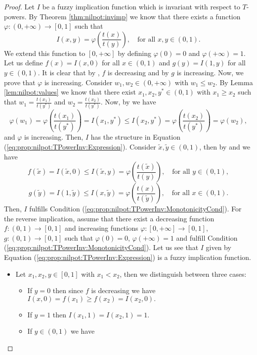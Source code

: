\begin{proof}
	Let $I$ be a fuzzy implication function which is invariant with respect to $T$-powers. By Theorem \ref{thm:nilpot:invimp} 
	we know that there exists a function $\varphi:(0,+\infty) \to [0,1]$ such that
	$$I(x,y)=\varphi \left(\frac{t(x)}{t(y)}\right), \quad \text{for all }x,y \in (0,1).$$
	We extend this function to $[0,+\infty]$ by defining $\varphi(0)=0$ and $\varphi(+\infty)=1$. Let us define $f(x)=I(x,0)$ for all $x \in (0,1)$ and $g(y)=I(1,y)$ for all $y \in (0,1)$. It is clear that by \Ione, $f$ is decreasing and by \Itwo $g$ is increasing. Now, we prove that $\varphi$ is increasing. Consider $w_1,w_2 \in (0,+\infty)$ with $w_1 \leq w_2$. By Lemma \ref{lem:nilpot:values} we know that there exist $x_1,x_2,y^* \in (0,1)$ with $x_1 \geq x_2$ such that $w_1=\frac{t(x_1)}{t(y^*)}$ and $w_2=\frac{t(x_2)}{t(y^*)}$. Now, by \Ione we have
	$$\varphi(w_1) = \varphi \left(\frac{t(x_1)}{t(y^*)}\right) = I(x_1,y^*) \leq I(x_2,y^*) = \varphi \left(\frac{t(x_2)}{t(y^*)}\right) = \varphi(w_2),$$
	and $\varphi$ is increasing. Then, $I$ has the structure in Equation (\ref{eq:prop:nilpot:TPowerInv:Expression}). Consider $\tilde{x},\tilde{y} \in (0,1)$, then by \Ione and \Itwo we have
	$$f(\tilde{x}) = I(\tilde{x},0) \leq I(\tilde{x},y) = \varphi \left( \frac{t(\tilde{x})}{t(y)} \right), \quad \text{for all } y \in (0,1),$$
	$$g(\tilde{y})=I(1,\tilde{y}) \leq I(x,\tilde{y})= \varphi\left(\frac{t(x)}{t(\tilde{y})}\right), \quad \text{for all } x \in (0,1).$$
	Then, $I$ fulfills Condition (\ref{eq:prop:nilpot:TPowerInv:MonotonicityCond}). For the reverse implication, assume that there exist a decreasing function $f:(0,1) \to [0,1]$ and increasing functions $\varphi:[0,+\infty] \to [0,1]$, $g:(0,1) \to [0,1]$ such that $\varphi(0)=0$, $\varphi(+\infty)=1$ and fulfill Condition (\ref{eq:prop:nilpot:TPowerInv:MonotonicityCond}). Let us see that $I$ given by Equation (\ref{eq:prop:nilpot:TPowerInv:Expression}) is a fuzzy implication function.
	\begin{itemize}
		\item Let $x_1,x_2,y \in [0,1]$ with $x_1 < x_2$, then we distinguish between three cases:
		\begin{itemize}
			\item If $y=0$ then since $f$ is decreasing we have $I(x,0)=f(x_1) \geq f(x_2)=I(x_2,0).$
			\item If $y=1$ then $I(x_1,1)=I(x_2,1)=1$.
			\item  If $ y \in (0,1)$ we have
			\begin{itemize}

\end{itemize}
\end{itemize}
\end{itemize}
\end{proof}
